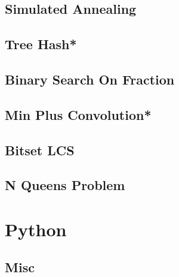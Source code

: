\subsection{Simulated Annealing}

\subsection{Tree Hash*} %

\subsection{Binary Search On Fraction}

\subsection{Min Plus Convolution*} %

\subsection{Bitset LCS}

\subsection{N Queens Problem}

\section{Python}
\subsection{Misc}

